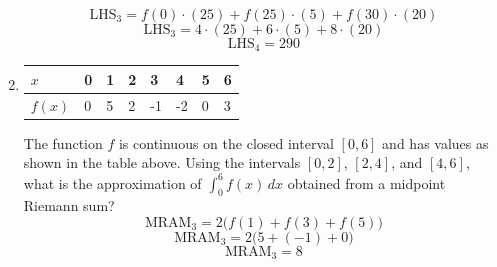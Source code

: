 \documentclass[12pt]{article}
\begin{document}
\begin{enumerate}
$$\text{LHS}_3 = f(0) \cdot (25) + f(25)\cdot (5) + f(30) \cdot (20) $$
$$\text{LHS}_3 = 4 \cdot (25) + 6 \cdot (5) + 8 \cdot (20) $$
$$\boxed{\text{LHS}_4 = 290}$$
\item 
\begin{table}[H]
\centering
\begin{tabular}{|l||l|l|l|l|l|l|l|}
\hline
$x$ & 0 & 1 & 2 & 3 & 4 & 5 & 6 \\ \hline
$f(x)$ & 0 & 5 & 2 & -1 & -2 & 0 & 3 \\ \hline
\end{tabular}
\end{table}
The function $f$ is continuous on the closed interval $[0, 6]$ and has values as shown in the table above. Using the intervals $[0,2]$, $[2,4]$, and $[4,6]$, what is the approximation of $\int_{0}^{6} f(x) \, dx$ obtained from a midpoint Riemann sum?
$$\text{MRAM}_3 = 2 \big( f(1) + f(3)+ f(5) \big)$$
$$\text{MRAM}_3 = 2 \big( 5 +(-1)+0 \big)$$
$$\boxed{\text{MRAM}_3 = 8}$$
\end{enumerate}
\end{document}
